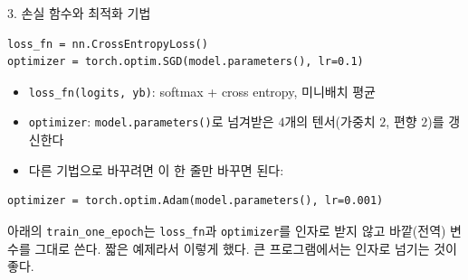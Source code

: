 \documentclass[aspectratio=169,11pt]{beamer}
\newcommand{\code}[1]{\texttt{#1}}
\begin{document}
\begin{frame}[fragile]{3. 손실 함수와 최적화 기법}
\begin{lstlisting}
loss_fn = nn.CrossEntropyLoss()
optimizer = torch.optim.SGD(model.parameters(), lr=0.1)
\end{lstlisting}
\begin{itemize}
\item \code{loss\_fn(logits, yb)}: softmax + cross entropy, 미니배치 평균
\item \code{optimizer}: \code{model.parameters()}로 넘겨받은 $4$개의 텐서(가중치 $2$, 편향 $2$)를 갱신한다
\item 다른 기법으로 바꾸려면 이 한 줄만 바꾸면 된다:
\end{itemize}
\begin{lstlisting}
optimizer = torch.optim.Adam(model.parameters(), lr=0.001)
\end{lstlisting}
\begin{thinkbox}[코드 구조에 대한 메모]
아래의 \code{train\_one\_epoch}는 \code{loss\_fn}과 \code{optimizer}를 인자로 받지 않고 바깥(전역) 변수를 그대로 쓴다.
짧은 예제라서 이렇게 했다. 큰 프로그램에서는 인자로 넘기는 것이 좋다.
\end{thinkbox}
\end{frame}
\end{document}
